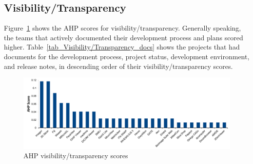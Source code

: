 \documentclass[11pt]{article}
\begin{document}
\subsection{Visibility/Transparency} \label{sec_result_visibility_transparency}

Figure~\ref{fg_visibility_transparency_scores} shows the AHP scores for
visibility/transparency. Generally speaking, the teams that actively documented
their development process and plans scored higher.
Table~\ref{tab_Visibility/Transparency_docs} shows the projects that had
documents for the development process, project status, development environment,
and release notes, in descending order of their visibility/transparency
scores.

\begin{figure}[!ht]
\includegraphics[scale=0.47]{visibility_transparency_scores.pdf}
\caption{AHP visibility/transparency scores}
\label{fg_visibility_transparency_scores}
\end{figure}
\end{document}
